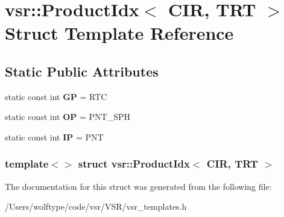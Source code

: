 \hypertarget{structvsr_1_1_product_idx_3_01_c_i_r_00_01_t_r_t_01_4}{\section{vsr\-:\-:Product\-Idx$<$ C\-I\-R, T\-R\-T $>$ Struct Template Reference}
\label{structvsr_1_1_product_idx_3_01_c_i_r_00_01_t_r_t_01_4}
}
\subsection*{Static Public Attributes}
\begin{DoxyCompactItemize}
\item 
\hypertarget{structvsr_1_1_product_idx_3_01_c_i_r_00_01_t_r_t_01_4_a1480f52c6f8f69e402208df8a5dc3644}{static const int {\bfseries G\-P} = R\-T\-C}\label{structvsr_1_1_product_idx_3_01_c_i_r_00_01_t_r_t_01_4_a1480f52c6f8f69e402208df8a5dc3644}

\item 
\hypertarget{structvsr_1_1_product_idx_3_01_c_i_r_00_01_t_r_t_01_4_a2c8b27a3914988d64fa4380b7824ef15}{static const int {\bfseries O\-P} = P\-N\-T\-\_\-\-S\-P\-H}\label{structvsr_1_1_product_idx_3_01_c_i_r_00_01_t_r_t_01_4_a2c8b27a3914988d64fa4380b7824ef15}

\item 
\hypertarget{structvsr_1_1_product_idx_3_01_c_i_r_00_01_t_r_t_01_4_a0d742e026f81efe51db29667936cc880}{static const int {\bfseries I\-P} = P\-N\-T}\label{structvsr_1_1_product_idx_3_01_c_i_r_00_01_t_r_t_01_4_a0d742e026f81efe51db29667936cc880}

\end{DoxyCompactItemize}
\subsubsection*{template$<$$>$ struct vsr\-::\-Product\-Idx$<$ C\-I\-R, T\-R\-T $>$}



The documentation for this struct was generated from the following file\-:\begin{DoxyCompactItemize}
\item 
/\-Users/wolftype/code/vsr/\-V\-S\-R/vsr\-\_\-templates.\-h\end{DoxyCompactItemize}
